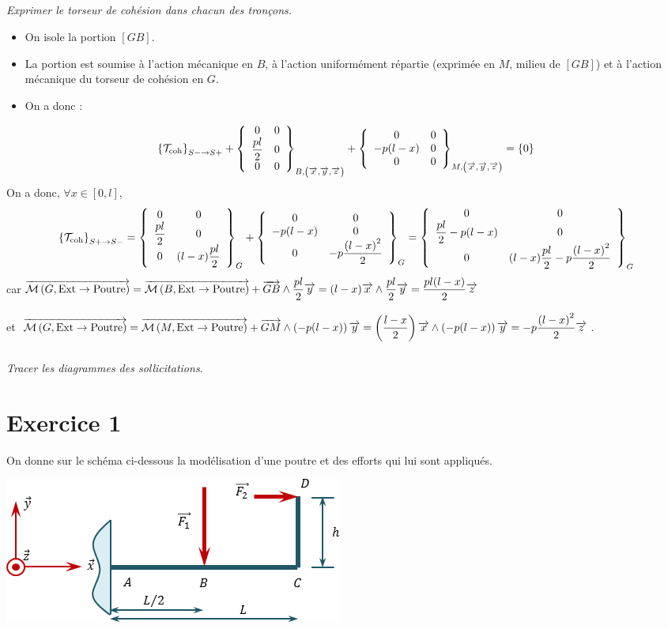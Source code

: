\documentclass[10pt,fleqn]{article} %
\begin{document}
\begin{multicols}{1}

\subparagraph{}
\textit{Exprimer le torseur de cohésion dans chacun des tronçons.}
\ifprof
\begin{corrige}
\begin{itemize}
\item On isole la portion $[GB]$.
\item La portion est soumise à l'action mécanique en $B$, à l'action uniformément répartie (exprimée en $M$, milieu de $[GB]$) et à l'action mécanique du torseur de cohésion en $G$.
\item On a donc : 
\end{itemize}
$$
\torseurscoh_{S-\rightarrow S+} +
 \torseurcol{0}{\dfrac{pl}{2}}{0}{0}{0}{0}{B,\left( \vect{x},\vect{y},\vect{z} \right)} 
 +\torseurcol{0}{-p(l-x)}{0}{0}{0}{0}{M,\left( \vect{x},\vect{y},\vect{z} \right)} 
 = \{0\}
$$
On a donc, $\forall x \in \left[0,l\right]$, 
$$
\torseurscoh_{S+\rightarrow S-}
= \torseurcol{0}{\dfrac{pl}{2}}{0}{0}{0}{(l-x)\dfrac{pl}{2}}{G} 
 +\torseurcol{0}{-p(l-x)}{0}{0}{0}{-p\dfrac{\left(l-x\right)^2}{2}}{G} 
 = \torseurcol{0}{\dfrac{pl}{2}-p(l-x)}{0}{0}{0}{(l-x)\dfrac{pl}{2}-p\dfrac{\left(l-x\right)^2}{2}}{G} 
$$
car 
$\vectm{G}{\text{Ext}}{\text{Poutre}}
=\vectm{B}{\text{Ext}}{\text{Poutre}} + \vect{GB}\wedge \dfrac{pl}{2} \vect{y}  
=  (l-x)\vect{x}  \wedge \dfrac{pl}{2} \vect{y}
=  \dfrac{pl(l-x)}{2} \vect{z}
$ 

et 
$\vectm{G}{\text{Ext}}{\text{Poutre}}
=  \vectm{M}{\text{Ext}}{\text{Poutre}} + \vect{GM}\wedge \left( -p(l-x) \right) \vect{y}  
= \left(\dfrac{l-x}{2}\right)\vect{x}\wedge \left(-p(l-x)\right) \vect{y}  
=  -p\dfrac{\left(l-x\right)^2}{2}\vect{z}  
$.
\end{corrige}
\else 
\fi

\subparagraph{}
\textit{Tracer les diagrammes des sollicitations.}
\ifprof
\begin{corrige}
\end{corrige}

\else 
\fi







\section*{Exercice 1}
\setcounter{subparagraph}{0}
On donne sur le schéma ci-dessous la modélisation d'une poutre et des efforts qui lui sont appliqués.
\begin{center}
\includegraphics[width=.45\textwidth]{images/exo_08}
\end{center}


\end{multicols}
\end{document}

